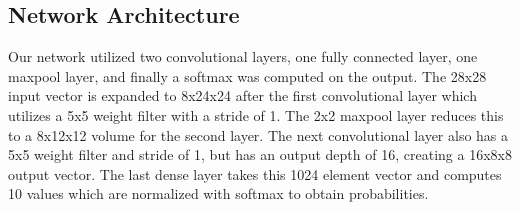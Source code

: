 \documentclass[11pt]{article}
\begin{document}
\subsection{Network Architecture}
Our network utilized two convolutional layers, one fully connected layer, one maxpool layer, and finally a softmax was computed on the output. The 28x28 input vector is expanded to 8x24x24 after the first convolutional layer which utilizes a 5x5 weight filter with a stride of 1. The 2x2 maxpool layer reduces this to a 8x12x12 volume for the second layer. The next convolutional layer also has a 5x5 weight filter and stride of 1, but has an output depth of 16, creating a 16x8x8 output vector. The last dense layer takes this 1024 element vector and computes 10 values which are normalized with softmax to obtain probabilities. 
\end{document}

